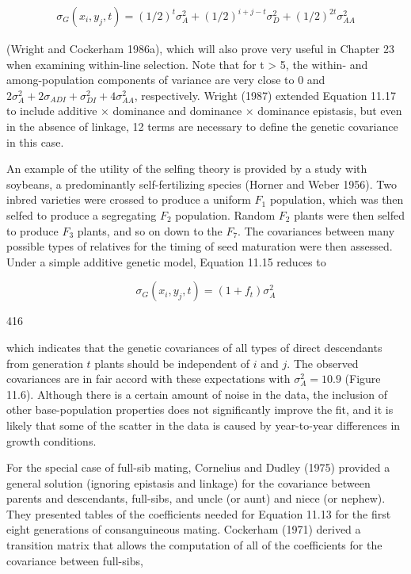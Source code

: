 \documentclass{article}
\begin{document}
\begin{equation}
\begin{align*}\sigma_G(x_i,y_j,t)=(1/2)^t\sigma_A^2+(1/2)^{i+j-t}\sigma_D^2+(1/2)^{2t}\sigma_{AA}^2\end{align*}
\tag{11.17}
\label{eq:11_17}
\end{equation}

(Wright and Cockerham 1986a), which will also prove very useful in Chapter 23 when examining within-line selection. Note that for t > 5, the within- and among-population components of variance are very close to 0 and  $ 2\sigma_A^2 + 2\sigma_{ADI} + \sigma_{DI}^2 + 4\sigma_{AA}^2 $, respectively. Wright (1987) extended Equation 11.17 to include additive × dominance and dominance × dominance epistasis, but even in the absence of linkage, 12 terms are necessary to define the genetic covariance in this case.

An example of the utility of the selfing theory is provided by a study with soybeans, a predominantly self-fertilizing species (Horner and Weber 1956). Two inbred varieties were crossed to produce a uniform  $ F_{1} $ population, which was then selfed to produce a segregating  $ F_{2} $ population. Random  $ F_{2} $ plants were then selfed to produce  $ F_{3} $ plants, and so on down to the  $ F_{7} $. The covariances between many possible types of relatives for the timing of seed maturation were then assessed. Under a simple additive genetic model, Equation 11.15 reduces to

\begin{equation}
\sigma_{G}(x_{i},y_{j},t)=(1+f_{t})\sigma_{A}^{2}
\end{equation}

416

which indicates that the genetic covariances of all types of direct descendants from generation  $ t $ plants should be independent of  $ i $ and  $ j $. The observed covariances are in fair accord with these expectations with  $ \sigma_A^2 = 10.9 $ (Figure 11.6). Although there is a certain amount of noise in the data, the inclusion of other base-population properties does not significantly improve the fit, and it is likely that some of the scatter in the data is caused by year-to-year differences in growth conditions.

For the special case of full-sib mating, Cornelius and Dudley (1975) provided a general solution (ignoring epistasis and linkage) for the covariance between parents and descendants, full-sibs, and uncle (or aunt) and niece (or nephew). They presented tables of the coefficients needed for Equation 11.13 for the first eight generations of consanguineous mating. Cockerham (1971) derived a transition matrix that allows the computation of all of the coefficients for the covariance between full-sibs,
\end{document}
